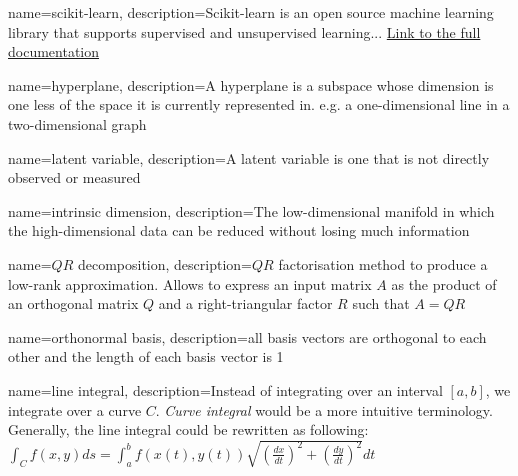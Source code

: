 

{
    name=scikit-learn,
    description={Scikit-learn is an open source machine learning library that supports supervised and unsupervised learning... \href{https://scikit-learn.org/stable/getting_started.html}{Link to the full documentation}}
}

{
    name=hyperplane,
    description={A hyperplane is a subspace whose dimension is one less of the space it is currently represented in. e.g. a one-dimensional line in a two-dimensional graph}
}

{
    name=latent variable,
    description={A latent variable is one that is not directly observed or measured \cite{rosipal2005overview}}
}

{
    name=intrinsic dimension,
    description={The low-dimensional manifold in which the high-dimensional data can be reduced without losing much information \cite{GeometricStructureWangCh1}}
}

{
    name=$QR$ decomposition,
    description={$QR$ factorisation method to produce a low-rank approximation. Allows to express an input matrix $A$ as the product of an orthogonal matrix $Q$ and a right-triangular factor $R$ such that $A = QR$ \cite{duersch2017randomized}}
}

{
    name=orthonormal basis,
    description={all basis vectors are orthogonal to each other and the length of each basis vector is 1 \cite{deisenroth2020mathematics}}
}

{
    name=line integral,
    description={Instead of integrating over an interval $[a,b]$, we integrate over a curve $C$.
    \emph{Curve integral} would be a more intuitive terminology. Generally, the line integral could be rewritten as following:\medskip
    \\
    $\int_C f(x,y) ds = \int_a^b f(x(t), y(t)) \sqrt{(\frac{dx}{dt})^2 + (\frac{dy}{dt})^2} dt$
    \quad \cite{stewart2016calculus}}
}
